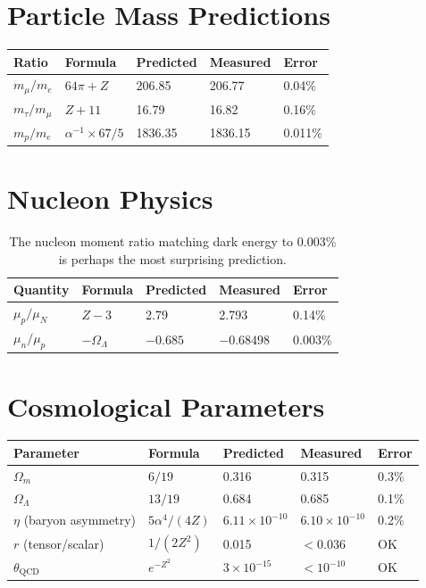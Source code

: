 \documentclass[11pt,a4paper]{article}
\theoremstyle{plain}
\theoremstyle{definition}
\theoremstyle{remark}
\newcommand{\Omegam}{\Omega_m}
\newcommand{\OmegaL}{\Omega_\Lambda}
\begin{document}
\section{Particle Mass Predictions}

\begin{table}[h!]
\centering
\begin{tabular}{lllll}
\toprule
\textbf{Ratio} & \textbf{Formula} & \textbf{Predicted} & \textbf{Measured} & \textbf{Error} \\
\midrule
$m_\mu/m_e$ & $64\pi + Z$ & 206.85 & 206.77 & 0.04\% \\
$m_\tau/m_\mu$ & $Z + 11$ & 16.79 & 16.82 & 0.16\% \\
$m_p/m_e$ & $\alpha^{-1} \times 67/5$ & 1836.35 & 1836.15 & 0.011\% \\
\bottomrule
\end{tabular}
\end{table}

\section{Nucleon Physics}

\begin{table}[h!]
\centering
\begin{tabular}{lllll}
\toprule
\textbf{Quantity} & \textbf{Formula} & \textbf{Predicted} & \textbf{Measured} & \textbf{Error} \\
\midrule
$\mu_p/\mu_N$ & $Z - 3$ & 2.79 & 2.793 & 0.14\% \\
$\mu_n/\mu_p$ & $-\OmegaL$ & $-0.685$ & $-0.68498$ & 0.003\% \\
\bottomrule
\end{tabular}
\caption{The nucleon moment ratio matching dark energy to 0.003\% is perhaps the most surprising prediction.}
\end{table}

\section{Cosmological Parameters}

\begin{table}[h!]
\centering
\begin{tabular}{lllll}
\toprule
\textbf{Parameter} & \textbf{Formula} & \textbf{Predicted} & \textbf{Measured} & \textbf{Error} \\
\midrule
$\Omegam$ & $6/19$ & 0.316 & 0.315 & 0.3\% \\
$\OmegaL$ & $13/19$ & 0.684 & 0.685 & 0.1\% \\
$\eta$ (baryon asymmetry) & $5\alpha^4/(4Z)$ & $6.11 \times 10^{-10}$ & $6.10 \times 10^{-10}$ & 0.2\% \\
$r$ (tensor/scalar) & $1/(2Z^2)$ & 0.015 & $<0.036$ & OK \\
$\theta_{\text{QCD}}$ & $e^{-Z^2}$ & $3 \times 10^{-15}$ & $<10^{-10}$ & OK \\
\bottomrule
\end{tabular}
\end{table}
\end{document}
